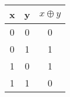 \begin{tabular}{ |c |c |c |}  
\hline 
\newline
\textbf{x} & \textbf{y} & \textbf{$x\oplus y$} \\
\hline
0 & 0 & 0\\
\hline  
0 & 1 & 1\\
\hline
1 & 0 & 1\\
\hline
1 & 1 & 0\\
\hline 
\end{tabular}
